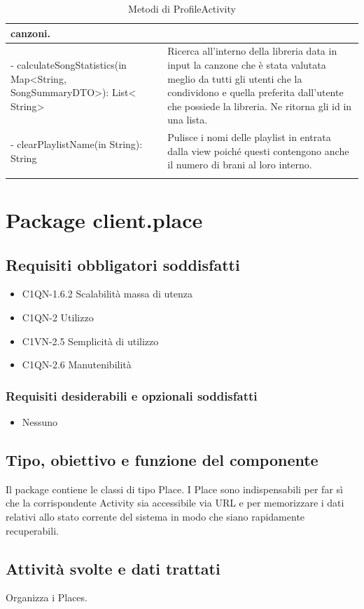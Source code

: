 \begin{longtable}{|p{}|p{}|}
canzoni.\\\hline
- calculateSongStatistics(in Map\textless String, SongSummaryDTO\textgreater): List\textless
String\textgreater & Ricerca all'interno della libreria data in input la canzone
che \`e stata valutata meglio da tutti gli utenti che la condividono e quella
preferita dall'utente che possiede la libreria. Ne ritorna gli id in una lista.\\\hline
- clearPlaylistName(in String): String & Pulisce i nomi delle playlist
in entrata dalla view poich\'e questi contengono anche il numero di
brani al loro interno.\\\hline
\caption{Metodi di ProfileActivity}
\end{longtable}


\newpage
\section{Package client.place} %
\subsection*{Requisiti obbligatori soddisfatti}
\begin{itemize}
	\item C1QN-1.6.2 Scalabilit\`a massa di utenza
	\item C1QN-2 Utilizzo
	\item C1VN-2.5 Semplicit\`a di utilizzo
	\item C1QN-2.6 Manutenibilit\`a
\end{itemize}
\subsubsection*{Requisiti desiderabili e opzionali soddisfatti}
\begin{itemize}
    \item Nessuno
\end{itemize}
\subsection*{Tipo, obiettivo e funzione del componente}
Il package contiene le classi di tipo Place. I Place sono indispensabili
per far s\`i che la corrispondente Activity sia accessibile via URL e per
memorizzare i dati relativi allo stato corrente del sistema in modo che siano
rapidamente recuperabili.
\subsection*{Attivit\`a svolte e dati trattati} Organizza i Places.
